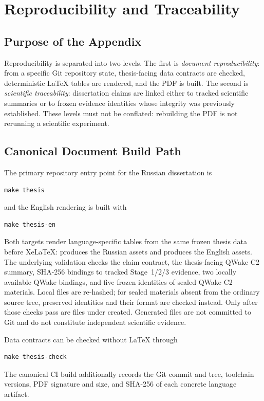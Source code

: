 \chapter{Reproducibility and Traceability}
\label{app:reproducibility-en}

\section{Purpose of the Appendix}

Reproducibility is separated into two levels. The first is \emph{document
reproducibility}: from a specific Git repository state, thesis-facing data contracts
are checked, deterministic LaTeX tables are rendered, and the PDF is built. The
second is \emph{scientific traceability}: dissertation claims are linked either to
tracked scientific summaries or to frozen evidence identities whose integrity was
previously established. These levels must not be conflated: rebuilding the PDF is
not rerunning a scientific experiment.

\section{Canonical Document Build Path}

The primary repository entry point for the Russian dissertation is
\begin{verbatim}
make thesis
\end{verbatim}
and the English rendering is built with
\begin{verbatim}
make thesis-en
\end{verbatim}
Both targets render language-specific tables from the same frozen thesis data before
XeLaTeX:  produces the Russian assets and
 produces the English assets. The underlying
validation checks the claim contract, the thesis-facing QWake C2 summary, SHA-256 bindings to
tracked Stage~1/2/3 evidence, two locally available QWake bindings, and five frozen
identities of sealed QWake C2 materials. Local files are re-hashed; for sealed
materials absent from the ordinary source tree, preserved identities and their format
are checked instead. Only after those checks pass are files under
 created. Generated files are not committed to Git and do not
constitute independent scientific evidence.

Data contracts can be checked without LaTeX through
\begin{verbatim}
make thesis-check
\end{verbatim}
The canonical CI build additionally records the Git commit and tree, toolchain
versions, PDF signature and size, and SHA-256 of each concrete language artifact.

